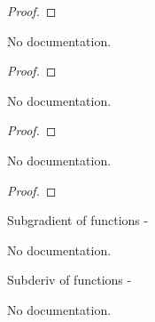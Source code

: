 \begin{proof}
    \leanok
\end{proof}

\begin{lemma}\label{convex_lipschitz}
        \leanok
                No documentation.
    \end{lemma}

\begin{proof}
    \leanok
\end{proof}

\begin{lemma}\label{point_descent_for_convex}
        \leanok
                No documentation.
    \end{lemma}

\begin{proof}
    \leanok
\end{proof}

\begin{lemma}\label{gradient_method}
        \leanok
                No documentation.
    \end{lemma}

\begin{proof}
    \leanok
\end{proof}

\begin{definition}\label{Banach_HasSubgradientAt}
        \leanok
                Subgradient of functions -
    \end{definition}

\begin{definition}\label{Banach_HasSubgradientWithinAt}
        \leanok
                No documentation.
    \end{definition}

\begin{definition}\label{Banach_SubderivAt}
        \leanok
                Subderiv of functions -
    \end{definition}

\begin{definition}\label{Banach_SubderivWithinAt}
        \leanok
                No documentation.
    \end{definition}

